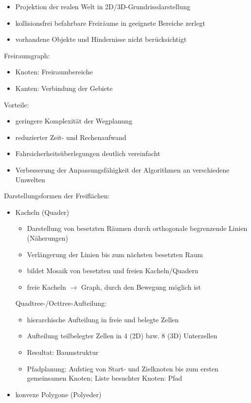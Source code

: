 \begin{itemize}
\item Projektion der realen Welt in 2D/3D-Grundrissdarstellung
\item kollisionsfrei befahrbare Freiräume in geeignete Bereiche zerlegt
\item vorhandene Objekte und Hindernisse nicht berücksichtigt
\end{itemize}
Freiraumgraph:
\begin{itemize}
\item Knoten: Freiraumbereiche
\item Kanten: Verbindung der Gebiete
\end{itemize}
Vorteile:
\begin{itemize}
\item geringere Komplexität der Wegplanung
\item reduzierter Zeit- und Rechenaufwand
\item Fahrsicherheitsüberlegungen deutlich vereinfacht
\item Verbesserung der Anpassungsfähigkeit der Algorithmen an verschiedene Umwelten
\end{itemize}
Darstellungsformen der Freiflächen:
\begin{itemize}
\item Kacheln (Quader)
\begin{itemize}
\item Darstellung von besetzten Räumen durch orthogonale begrenzende Linien (Näherungen)
\item Verlängerung der Linien bis zum nächsten besetzten Raum
\item bildet Mosaik von besetzten und freien Kacheln/Quadern
\item freie Kacheln $\to$ Graph, durch den Bewegung möglich ist
\end{itemize}
Quadtree-/Octtree-Aufteilung:
\begin{itemize}
\item hierarchische Aufteilung in freie und belegte Zellen
\item Aufteilung teilbelegter Zellen in 4 (2D) bzw. 8 (3D) Unterzellen
\item Resultat: Baumstruktur
\item Pfadplanung: Aufstieg von Start- und Zielknoten bis zum ersten gemeinsamen Knoten; Liste besuchter Knoten: Pfad
\end{itemize}
\item konvexe Polygone (Polyeder)
\end{itemize}

